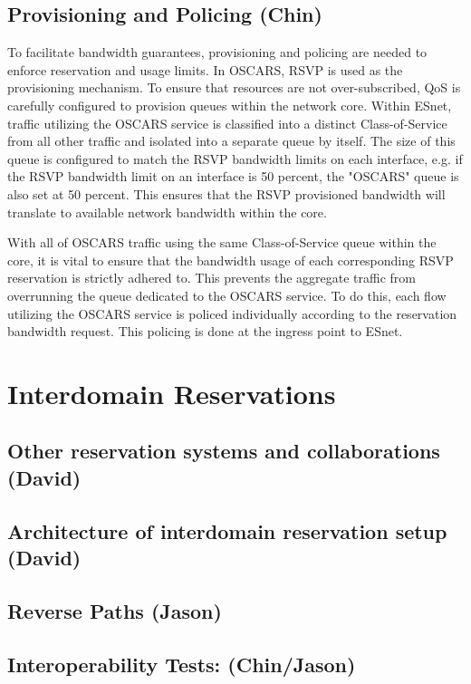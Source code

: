 \documentclass[conference]{IEEEtran}
\begin{document}
\subsection{Provisioning and Policing (Chin)}
To facilitate bandwidth guarantees, provisioning and policing are needed to 
enforce reservation and usage limits.  In OSCARS, RSVP is used as the 
provisioning mechanism.  To ensure that resources are not over-subscribed, QoS is 
carefully configured to provision queues within the network core.  Within ESnet, 
traffic utilizing the OSCARS service is classified into a distinct 
Class-of-Service from all other traffic and isolated into a separate queue by 
itself.  The size of this queue is configured to match the RSVP bandwidth 
limits on each interface, e.g. if the RSVP bandwidth limit on an interface is 
50 percent, the 
"OSCARS" queue is also set at 50 percent.  This ensures that the RSVP 
provisioned 
bandwidth will translate to available network bandwidth within the core.

With all of OSCARS traffic using the same Class-of-Service queue within the core, 
it is vital to ensure that the bandwidth usage of each corresponding RSVP 
reservation is strictly adhered to.  This prevents the aggregate traffic from 
overrunning the queue dedicated to the OSCARS service.  To do this, each flow 
utilizing the OSCARS service is policed individually according to the reservation 
bandwidth request.  This policing is done at the ingress point to ESnet.

\section{Interdomain Reservations}
\subsection{Other reservation systems and collaborations (David)}
\subsection{Architecture of interdomain reservation setup (David)}
\subsection{Reverse Paths (Jason)}
\subsection{Interoperability Tests:  (Chin/Jason)}
\end{document}
